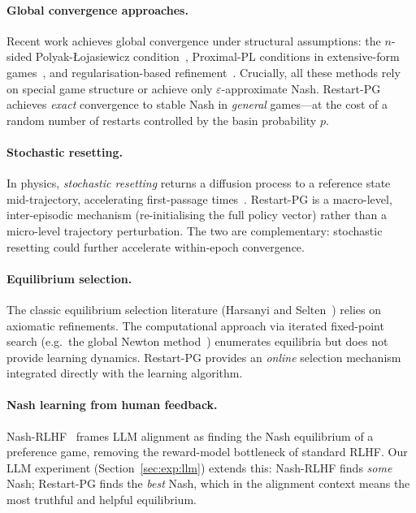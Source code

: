 \documentclass{article}
\begin{document}
\paragraph{Global convergence approaches.}
Recent work achieves global convergence under structural assumptions:
the $n$-sided Polyak-{\L}ojasiewicz condition~\cite{chao2026},
Proximal-PL conditions in extensive-form
games~\cite{kalogiannis2025}, and regularisation-based
refinement~\cite{nashpg2025}. Crucially, all these methods rely on
special game structure or achieve only $\varepsilon$-approximate Nash.
Restart-PG achieves \emph{exact} convergence to stable Nash in
\emph{general} games---at the cost of a random number of restarts
controlled by the basin probability $p$.

\paragraph{Stochastic resetting.}
In physics, \emph{stochastic resetting} returns a diffusion process to
a reference state mid-trajectory, accelerating first-passage
times~\cite{evans2020resetting}. Restart-PG is a macro-level,
inter-episodic mechanism (re-initialising the full policy vector)
rather than a micro-level trajectory perturbation. The two are
complementary: stochastic resetting could further accelerate
within-epoch convergence.

\paragraph{Equilibrium selection.}
The classic equilibrium selection literature (Harsanyi and
Selten~\cite{harsanyi1988}) relies on axiomatic refinements. The
computational approach via iterated fixed-point search (e.g.\ the
global Newton method~\cite{govindan2003}) enumerates equilibria but
does not provide learning dynamics. Restart-PG provides an
\emph{online} selection mechanism integrated directly with the
learning algorithm.

\paragraph{Nash learning from human feedback.}
Nash-RLHF~\cite{munos2024nash} frames LLM alignment as finding the
Nash equilibrium of a preference game, removing the reward-model
bottleneck of standard RLHF. Our LLM experiment (Section~\ref{sec:exp:llm})
extends this: Nash-RLHF finds \emph{some} Nash; Restart-PG
finds the \emph{best} Nash, which in the alignment context means
the most truthful and helpful equilibrium.
\end{document}
